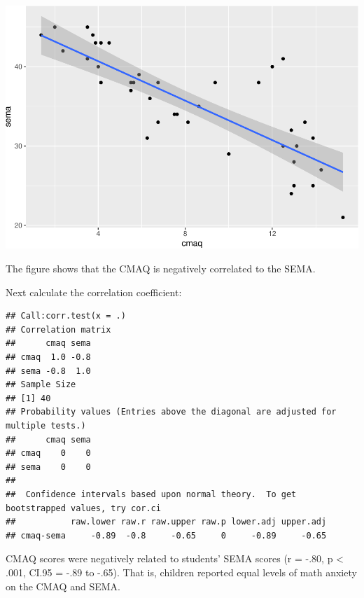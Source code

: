 \documentclass[
]{book}
\newenvironment{Shaded}{\begin{snugshade}}{\end{snugshade}}
\newcommand{\DataTypeTok}[1]{\textcolor[rgb]{0.13,0.29,0.53}{#1}}
\newcommand{\KeywordTok}[1]{\textcolor[rgb]{0.13,0.29,0.53}{\textbf{#1}}}
\newcommand{\NormalTok}[1]{#1}
\newcommand{\OperatorTok}[1]{\textcolor[rgb]{0.81,0.36,0.00}{\textbf{#1}}}
\newcommand{\OtherTok}[1]{\textcolor[rgb]{0.56,0.35,0.01}{#1}}
\newcommand{\StringTok}[1]{\textcolor[rgb]{0.31,0.60,0.02}{#1}}
\begin{document}
\includegraphics{Tools-for-working-with-data-211_files/figure-latex/unnamed-chunk-26-1.pdf}

The figure shows that the CMAQ is negatively correlated to the SEMA.

Next calculate the correlation coefficient:

\begin{Shaded}
\end{Shaded}

\begin{verbatim}
## Call:corr.test(x = .)
## Correlation matrix 
##      cmaq sema
## cmaq  1.0 -0.8
## sema -0.8  1.0
## Sample Size 
## [1] 40
## Probability values (Entries above the diagonal are adjusted for multiple tests.) 
##      cmaq sema
## cmaq    0    0
## sema    0    0
## 
##  Confidence intervals based upon normal theory.  To get bootstrapped values, try cor.ci
##           raw.lower raw.r raw.upper raw.p lower.adj upper.adj
## cmaq-sema     -0.89  -0.8     -0.65     0     -0.89     -0.65
\end{verbatim}

CMAQ scores were negatively related to students' SEMA scores (r = -.80, p \textless{} .001, CI.95 = -.89 to -.65). That is, children reported equal levels of math anxiety on the CMAQ and SEMA.
\end{document}
